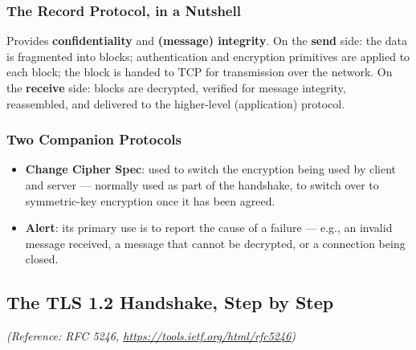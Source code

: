 \documentclass[12pt, a4paper]{article}
\begin{document}
\subsubsection{The Record Protocol, in a Nutshell}
Provides \textbf{confidentiality} and \textbf{(message) integrity}. On the \textbf{send} side: the data is fragmented into blocks; authentication and encryption primitives are applied to each block; the block is handed to TCP for transmission over the network. On the \textbf{receive} side: blocks are decrypted, verified for message integrity, reassembled, and delivered to the higher-level (application) protocol.

\subsubsection{Two Companion Protocols}
\begin{itemize}
    \item \textbf{Change Cipher Spec}: used to switch the encryption being used by client and server --- normally used as part of the handshake, to switch over to symmetric-key encryption once it has been agreed.
    \item \textbf{Alert}: its primary use is to report the cause of a failure --- e.g., an invalid message received, a message that cannot be decrypted, or a connection being closed.
\end{itemize}

\subsection{The TLS 1.2 Handshake, Step by Step}
\label{subsec:tls-handshake-05}
\textit{(Reference: RFC 5246, \url{https://tools.ietf.org/html/rfc5246})}
\end{document}
